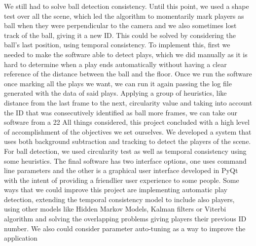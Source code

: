 We still had to solve ball detection consistency. Until this point, we used a shape test over all the scene, which led the algorithm to momentarily mark players as ball when they were perpendicular to the camera and we also sometimes lost track of the ball, giving it a new ID. This could be solved by considering the ball’s last position, using temporal consistency. 
To implement this, first we needed to make the software able to detect plays, which we did manually as it is hard to determine when a play ends automatically without having a clear reference of the distance between the ball and the floor. Once we run the software once marking all the plays we want, we can run it again passing the log file generated with the data of said plays. Applying a group of heuristics, like distance from the last frame to the next, circularity value and taking into account the ID that was consecutively identified as ball more frames, we can take our software from a 22%
All things considered, this project concluded with a high level of accomplishment of the objectives we set ourselves. We developed a system that uses both background subtraction and tracking to detect the players of the scene. For ball detection, we used circularity test as well as temporal consistency using some heuristics. The final software has two interface options, one uses command line parameters and the other is a graphical user interface developed in PyQt with the intent of providing a friendlier user experience to some people.
Some ways that we could improve this project are implementing automatic play detection, extending the temporal consistency model to include also players, using other models like Hidden Markov Models, Kalman filters or Viterbi algorithm and solving the overlapping problems giving players their previous ID number. We also could consider parameter auto-tuning as a way to improve the application
